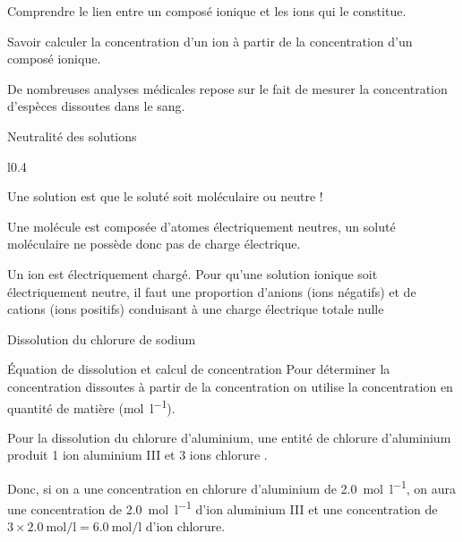 \teteTermStssDosa
{}

\begin{objectifs}
  \item Comprendre le lien entre un composé ionique et les ions qui le constitue.
  \item Savoir calculer la concentration d'un ion à partir de la concentration d'un composé ionique.
\end{objectifs}

\begin{contexte}
  De nombreuses analyses médicales repose sur le fait de mesurer la concentration d'espèces dissoutes dans le sang.
  
\end{contexte}


\begin{doc}{Neutralité des solutions}
  \begin{wrapfigure}{l}{0.4\linewidth}
    \vspace*{-18pt}
  \end{wrapfigure}
  Une solution est  que le soluté soit moléculaire ou neutre !

  Une molécule est composée d'atomes électriquement neutres, un soluté moléculaire ne possède donc pas de charge électrique.
  
  Un ion est électriquement chargé. Pour qu'une solution ionique soit électriquement neutre, il faut une proportion d'anions (ions négatifs) et de cations (ions positifs) conduisant à une charge électrique totale nulle

  \textcolor{couleurPrim}{\faLongArrowLeft} Dissolution du chlorure de sodium
\end{doc}

\begin{doc}{Équation de dissolution et calcul de concentration}
  Pour déterminer la concentration  dissoutes à partir de la concentration  on utilise la concentration en quantité de matière (\unit{\mole\per\litre}).
  \medskip

  \exemple Pour la dissolution du chlorure d'aluminium, une entité de chlorure d'aluminium  produit 1 ion aluminium III  et 3 ions chlorure \chlorure.

  Donc, si on a une concentration en chlorure d'aluminium de \qty{2,0}{\mole\per\litre}, on aura une concentration de \qty{2,0}{\mole\per\litre} d'ion aluminium III et une concentration de $3\times\qty{2,0}{\mole\per\litre} = \qty{6,0}{\mole\per\litre}$ d'ion chlorure.
\end{doc}

